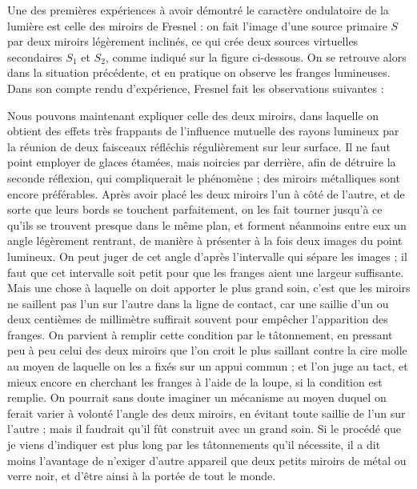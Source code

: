 \documentclass[11pt,fleqn]{book} %
\begin{document}
\begin{encart}
	Une des premières expériences à avoir démontré le caractère ondulatoire de la lumière est celle des miroirs de Fresnel : on fait l'image d'une source primaire $S$ par deux miroirs légèrement inclinés, ce qui crée deux sources virtuelles secondaires $S_1$ et $S_2$, comme indiqué sur la figure ci-dessous.
	On se retrouve alors dans la situation précédente, et en pratique on observe les franges lumineuses. Dans son compte rendu d'expérience, Fresnel fait les observations suivantes :
	\begin{displayquote}
	{\small Nous pouvons maintenant expliquer celle des deux miroirs, dans laquelle on obtient des effets très frappants de l'influence mutuelle des rayons lumineux par la réunion de deux faisceaux réfléchis régulièrement sur leur surface. Il ne faut point employer de glaces étamées, mais noircies par derrière, afin de détruire la seconde réflexion, qui compliquerait le phénomène ; des miroirs métalliques sont encore préférables. Après avoir placé les deux miroirs l'un à côté de l'autre, et de sorte que leurs bords se touchent parfaitement, on les fait tourner jusqu'à ce qu'ils se trouvent presque dans le même plan, et forment néanmoins entre eux un angle légèrement rentrant, de manière à présenter à la fois deux images du point lumineux. On peut juger de cet angle d'après l'intervalle qui sépare les images ; il faut que cet intervalle soit petit pour que les franges aient une largeur suffisante. Mais une chose à laquelle on doit apporter le plus grand soin, c'est que les miroirs ne saillent pas l'un sur l'autre dans la ligne de contact, car une saillie d'un ou deux centièmes de millimètre suffirait souvent pour empêcher l'apparition des franges. On parvient à remplir cette condition par le tâtonnement, en pressant peu à peu celui des deux miroirs que l'on croit le plus saillant contre la cire molle au moyen de laquelle on les a fixés sur un appui commun ; et l'on juge au tact, et mieux encore en cherchant les franges à l'aide de la loupe, si la condition est remplie. On pourrait sans doute imaginer un mécanisme au moyen duquel on ferait varier à volonté l'angle des deux miroirs, en évitant toute saillie de l'un sur l'autre ; mais il faudrait qu'il fût construit avec un grand soin. Si le procédé que je viens d'indiquer est plus long par les tâtonnements qu'il nécessite, il a dit moins l'avantage de n'exiger d'autre appareil que deux petits miroirs de métal ou verre noir, et d'être ainsi à la portée de tout le monde.

}
\end{displayquote}
\end{encart}
\end{document}
